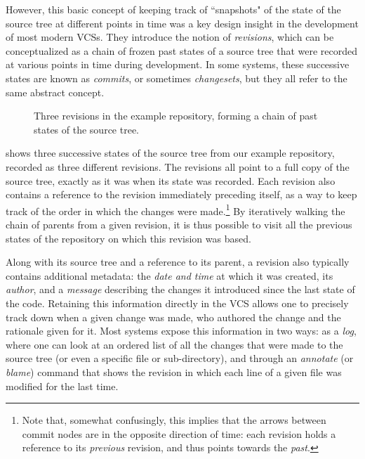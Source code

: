 However, this basic concept of keeping track of ``snapshots" of the state of the
source tree at different points in time was a key design insight in the
development of most modern \glspl{VCS}. They introduce the notion of
\emph{revisions}, which can be conceptualized as a chain of frozen past states
of a source tree that were recorded at various points in time during
development. In some systems, these successive states are known as
\emph{commits}, or sometimes \emph{changesets}, but they all refer to the same
abstract concept.

\begin{figure}
    \centering
    
    \caption{Three revisions in the example repository, forming a chain of
    past states of the source tree.}%
    \label{fig:vcs-rev-chain-example}
\end{figure}

 shows three successive states of the source
tree from our example repository, recorded as three different revisions. The
revisions all point to a full copy of the source tree, exactly as it was when its
state was recorded. Each revision also contains a reference to the revision
immediately preceding itself, as a way to keep track of the order in which the
changes were made.\footnote{Note that, somewhat confusingly, this implies that
the arrows between commit nodes are in the opposite direction of time: each
revision holds a reference to its \emph{previous} revision, and thus points
towards the \emph{past}.} By iteratively walking the chain of parents from a
given revision, it is thus possible to visit all the previous states of the
repository on which this revision was based.

Along with its source tree and a reference to its parent, a revision also
typically contains additional metadata: the \emph{date and time} at which it
was created, its \emph{author}, and a \emph{message} describing the changes it
introduced since the last state of the code. Retaining this information
directly in the \gls{VCS} allows one to precisely track down when a given
change was made, who authored the change and the rationale given for it. Most
systems expose this information in two ways: as a \emph{log}, where one can
look at an ordered list of all the changes that were made to the source tree
(or even a specific file or sub-directory), and through an \emph{annotate} (or
\emph{blame}) command that shows the revision in which each line of a given
file was modified for the last time.

